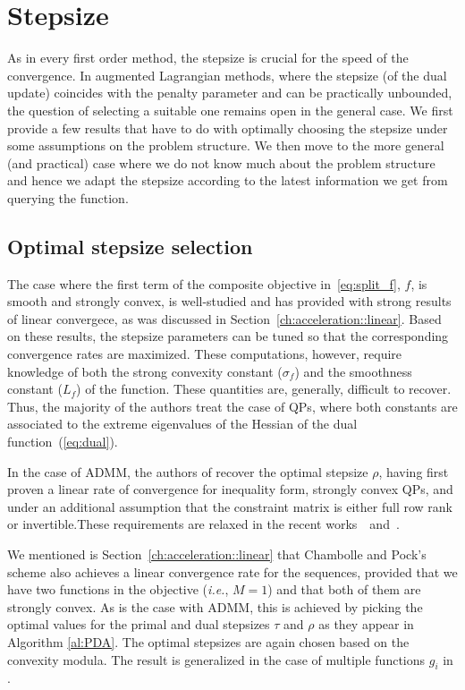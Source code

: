 \documentclass[openany]{now}
\newcommand{\ie}{{\it i.e.}}
\begin{document}
\section{Stepsize}
As in every first order method, the stepsize is crucial for the speed of the convergence. In augmented Lagrangian methods, where the stepsize (of the dual update) coincides with the penalty parameter and can be practically unbounded, the question of selecting a suitable one remains open in the general case.
We first provide a few results that have to do with optimally choosing the stepsize under some assumptions on the problem structure. We then move to the more general (and practical) case where we do not know much about the problem structure and hence we adapt the stepsize according to the latest information we get from querying the function.
\subsection{Optimal stepsize selection}
The case where the first term of the composite objective in~\eqref{eq:split_f}, $f$, is smooth and strongly convex, is well-studied and has provided with strong results of linear convergece, as was discussed in Section~\ref{ch:acceleration::linear}. Based on these results, the stepsize parameters can be tuned so that the corresponding convergence rates are maximized. These computations, however, require knowledge of both the strong convexity constant ($\sigma_f$) and the smoothness constant ($L_f$) of the function. These quantities are, generally, difficult to recover. Thus, the majority of the authors treat the case of QPs, where both constants are associated to the extreme eigenvalues of the Hessian of the dual function~(\ref{eq:dual}).

In the case of ADMM, the authors of \cite{ghadimi2013optimal} recover the optimal stepsize $\rho$, having first proven a linear rate of convergence for inequality form, strongly convex QPs, and under an additional assumption that the constraint matrix is either full row rank or invertible.These requirements are relaxed in the recent works~\cite{Raghunathan2014jun3}~and~\cite{giselsson2014metric}.

We mentioned is Section~\ref{ch:acceleration::linear} that Chambolle and Pock's scheme also achieves a linear convergence rate for the sequences, provided that we have two functions in the objective (\ie, $M=1$) and that both of them are strongly convex. As is the case with ADMM, this is achieved by picking the optimal values for the primal and dual stepsizes $\tau$ and $\rho$ as they appear in Algorithm \ref{al:PDA}. The optimal stepsizes are again chosen based on the convexity modula. The result is generalized in the case of multiple functions $g_i$ in \cite{bot2013convergence}.
\end{document}
